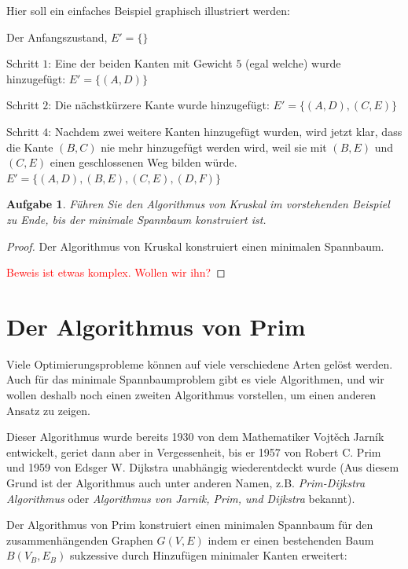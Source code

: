 \documentclass[12pt,a4paper]{report}
\theoremstyle{break}
\newtheorem{exercise}{Aufgabe}[section]
\theoremstyle{plain}
\newtheorem{proof}{Satz}[section]
\newcommand{\algostep}[2]{\parbox{4cm}{\scalebox{0.5}{\texttt{[image: \#1]}}}
  \hfill
  \parbox{7cm}{#2}
}
\begin{document}
\newpage
Hier soll ein einfaches Beispiel graphisch illustriert werden:

\algostep{Demo.pdf}{Der Anfangszustand, $E' = \{\}$}
\algostep{DemoKruskal1.pdf}{Schritt $1$: Eine der beiden Kanten mit Gewicht $5$
  (egal welche) wurde hinzugef\"ugt: $E' = \{(A,D)\}$}
\algostep{DemoKruskal2.pdf}{Schritt $2$: Die n\"{a}chstk\"{u}rzere
  Kante wurde hinzugef\"ugt: $E' = \{(A,D), (C,E)\}$}
\algostep{DemoKruskal3.pdf}{Schritt $4$: Nachdem zwei weitere Kanten
  hinzugef\"ugt wurden, wird jetzt klar, dass die Kante $(B,C)$ nie
  mehr hinzugef\"ugt werden wird, weil sie mit $(B,E)$ und $(C,E)$
  einen geschlossenen Weg bilden w\"{u}rde. $E' = \{(A,D), (B,E),
  (C,E), (D,F)\}$}

\newpage
\begin{exercise}\label{exkruskal}
F\"{u}hren Sie den Algorithmus von Kruskal im vorstehenden Beispiel zu
Ende, bis der minimale Spannbaum konstruiert ist.
\end{exercise}

\begin{proof}\label{kruskproof}Der Algorithmus von Kruskal konstruiert
  einen minimalen Spannbaum.

\textcolor{red}{Beweis ist etwas komplex. Wollen wir ihn?}
\end{proof}

\section{Der Algorithmus von Prim}

Viele Optimierungsprobleme k\"{o}nnen auf viele verschiedene Arten
gel\"{o}st werden. Auch f\"{u}r das minimale Spannbaumproblem gibt es
viele Algorithmen, und wir wollen deshalb noch einen zweiten
Algorithmus vorstellen, um einen anderen Ansatz zu zeigen.

Dieser Algorithmus wurde bereits 1930 von dem Mathematiker
Vojt\v{e}ch Jarn\'ik entwickelt, geriet dann aber in Vergessenheit,
bis er 1957 von Robert C. Prim und 1959 von Edsger W. Dijkstra
unabh\"{a}ngig wiederentdeckt wurde (Aus diesem Grund ist der
Algorithmus auch unter anderen Namen, z.B. \emph{Prim-Dijkstra
  Algorithmus} oder \emph{Algorithmus von Jarnik, Prim, und Dijkstra}
bekannt).

Der Algorithmus von Prim konstruiert einen minimalen Spannbaum f\"{u}r
den zusammenh\"{a}ngenden Graphen $G(V,E)$ indem er einen bestehenden Baum $B(V_B,E_B)$
sukzessive durch Hinzuf\"{u}gen minimaler Kanten erweitert:
\end{document}
